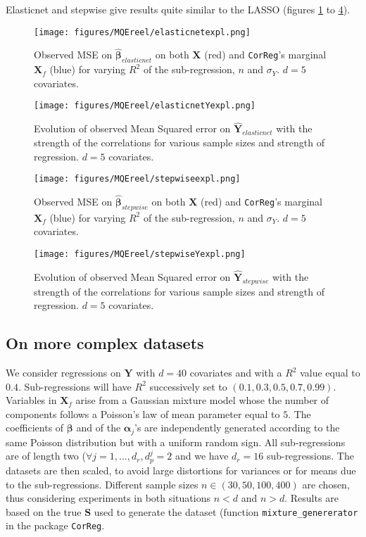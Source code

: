 \documentclass[12pt,a4paper]{report}
\begin{document}
Elasticnet and stepwise give results quite similar to the LASSO (figures \ref{MSEelasticnetexpl} to \ref{MQEstepwiseYexpl}).
	\begin{figure}[h!]
	\texttt{[image: figures/MQEreel/elasticnetexpl.png]}
	\caption{Observed MSE on $\hat{\boldsymbol{\beta}}_{elasticnet}$ on both $\boldsymbol{X}$ (red) and {\tt CorReg}'s marginal $\boldsymbol{X}_f$ (blue) for varying $R^2$ of the sub-regression, $n$ and $\sigma_Y$. $d=5$ covariates.}\label{MSEelasticnetexpl}
\end{figure} 
	
	 \begin{figure}
	 \centering
	  \texttt{[image: figures/MQEreel/elasticnetYexpl.png]}
	  \caption{Evolution of observed Mean Squared error on $\hat{\boldsymbol{Y}}_{elasticnet}$ with the strength of the correlations for various sample sizes and strength of regression. $d=5$ covariates. } \label{MQEelasticnetYexpl}
	\end{figure}
	\begin{figure}[h!]
	\texttt{[image: figures/MQEreel/stepwiseexpl.png]}\label{MSEstepwiseexpl}
	\caption{Observed MSE on $\hat{\boldsymbol{\beta}}_{stepwise}$ on both $\boldsymbol{X}$ (red) and {\tt CorReg}'s marginal $\boldsymbol{X}_f$ (blue) for varying $R^2$ of the sub-regression, $n$ and $\sigma_Y$. $d=5$ covariates.}
\end{figure} 
	
	 \begin{figure}
	 \centering
	  \texttt{[image: figures/MQEreel/stepwiseYexpl.png]}
	  \caption{Evolution of observed Mean Squared error on $\hat{\boldsymbol{Y}}_{stepwise}$ with the strength of the correlations for various sample sizes and strength of regression. $d=5$ covariates. } \label{MQEstepwiseYexpl}
	\end{figure}
	
 	\FloatBarrier
	\subsection{On more complex datasets}\label{thedatasets}
		
We consider regressions on $\boldsymbol{Y}$ with $d=40$ covariates and with a $R^2$ value equal to $0.4$. Sub-regressions will have $R^2$ successively set to $(0.1,0.3,0.5,0.7,0.99)$. Variables in $\boldsymbol{X}_f$ arise from a Gaussian mixture model whose the number of components follows a Poisson's law of mean parameter equal to $5$. The coefficients of $\boldsymbol{\beta}$ and of the $\boldsymbol{\alpha}_j$'s are independently generated according to the same Poisson distribution but with a uniform random sign. All sub-regressions are of length two ($\forall j=1,\ldots,d_r, d_p^j=2$ and we have $d_r=16$ sub-regressions. The datasets are then scaled, to avoid large distortions for variances or for means due to the sub-regressions.	Different sample sizes  $n\in (30,50,100,400)$ are chosen, thus considering experiments in both situations $n<d$ and $n>d$. 
	Results are based on the true $\boldsymbol{S}$ used to generate the dataset (function {\tt mixture\_genererator} in the package {\tt CorReg}.\\
	
\end{document}
